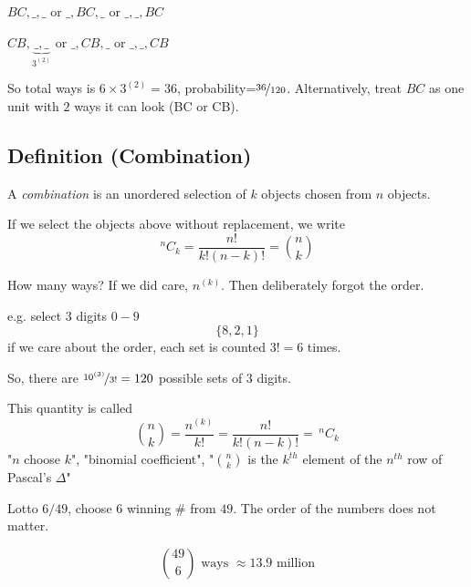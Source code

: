 $ BC,\_,\_ $ or $ \_,BC,\_ $ or $ \_,\_,BC $

$ CB,\underbrace{\_,\_}_{3^{(2)}} $ or $ \_,CB,\_ $ or $ \_,\_,CB $

So total ways is $ 6\times 3^{(2)}=36 $, probability=$ \nicefrac{36}{120} $.
Alternatively, treat $ BC $ as one unit with $ 2 $ ways it can look
(BC or CB).


\begin{defbox}
    \subsection{Definition (Combination)}
    A \emph{combination} is an unordered selection of $ k $
    objects chosen from $ n $ objects.

    If we select the objects above without replacement, we write
    \[ ^nC_k=\frac{n!}{k!(n-k)!}=\binom{n}{k} \]
\end{defbox}

How many ways? If we did care, $ n^{(k)} $. Then deliberately forgot the order.

e.g. select $ 3 $ digits $ 0-9 $
\[ \{8,2,1\} \]
if we care about the order, each set is counted $ 3!=6 $ times.

So, there are $ \nicefrac{10^{(3)}}{3!}=120 $ possible sets of $ 3 $ digits.

This quantity is called
\[ \binom{n}{k}=\frac{n^{(k)}}{k!}=\frac{n!}{k!(n-k)!}=\, ^nC_k \]
"$ n $ choose $ k $", "binomial coefficient",
"$ \binom{n}{k} $ is the $ k^{th} $ element of the $ n^{th} $ row of Pascal's
$ \Delta $"


Lotto $ 6/49 $, choose $ 6 $ winning \# from $ 49 $. The order of the numbers
does not matter.

\[ \binom{49}{6}\text{ ways }\approx 13.9 \text{ million} \]
